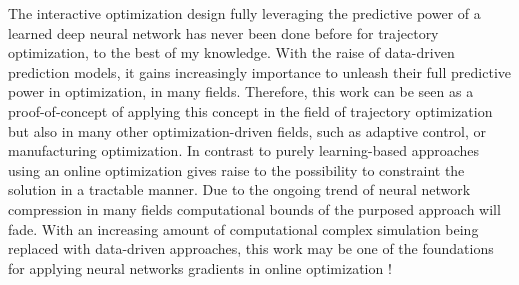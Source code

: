 The interactive optimization design fully leveraging the predictive power of a learned deep neural network has never been done before for trajectory optimization, to the best of my knowledge. With the raise of data-driven prediction models, it gains increasingly importance to unleash their full predictive power in optimization, in many fields. Therefore, this work can be seen as a proof-of-concept of applying this concept in the field of trajectory optimization but also in many other optimization-driven fields, such as adaptive control, or manufacturing optimization. In contrast to purely learning-based approaches using an online optimization gives raise to the possibility to constraint the solution in a tractable manner. Due to the ongoing trend of neural network compression in many fields computational bounds of the purposed approach will fade. With an increasing amount of computational complex simulation being replaced with data-driven approaches, this work may be one of the foundations for applying neural networks gradients in online optimization !
